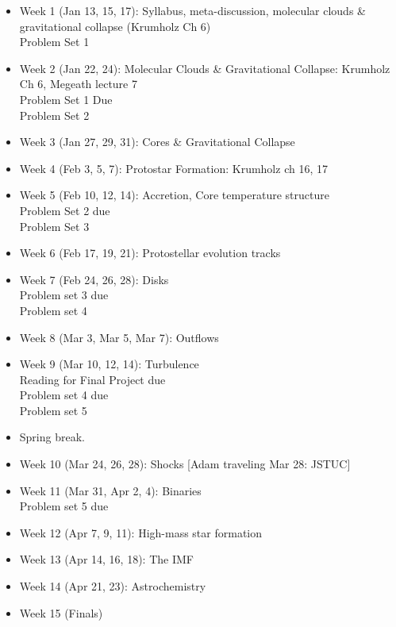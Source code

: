 \documentclass[11pt]{article}
\begin{document}
\begin{itemize}
    \item Week 1 (Jan 13, 15, 17): Syllabus, meta-discussion, molecular clouds \& gravitational collapse (Krumholz Ch 6) \\
        Problem Set 1
    \item Week 2 (Jan 22, 24): Molecular Clouds \& Gravitational Collapse: Krumholz Ch 6, Megeath lecture 7  \\
        Problem Set 1 Due \\
        Problem Set 2
    \item Week 3 (Jan 27, 29, 31): Cores \& Gravitational Collapse  \\
    \item Week 4 (Feb 3, 5, 7): Protostar Formation: Krumholz ch 16, 17  \\
    \item Week 5 (Feb 10, 12, 14): Accretion, Core temperature structure \\
        Problem Set 2 due\\
        Problem Set 3
    \item Week 6 (Feb 17, 19, 21): Protostellar evolution tracks \\
    \item Week 7 (Feb 24, 26, 28): Disks \\
        Problem set 3 due \\
        Problem set 4 
    \item Week 8 (Mar 3, Mar 5, Mar 7): Outflows  \\
    \item Week 9 (Mar 10, 12, 14): Turbulence \\
        Reading for Final Project due \\
        Problem set 4 due \\
        Problem set 5
    \item Spring break.
    \item Week 10 (Mar 24, 26, 28): Shocks [Adam traveling Mar 28: JSTUC] \\ 
    \item Week 11 (Mar 31, Apr 2, 4):  Binaries \\ 
        Problem set 5 due\\
    \item Week 12 (Apr 7, 9, 11):  High-mass star formation  \\
    \item Week 13 (Apr 14, 16, 18): The IMF \\
    \item Week 14 (Apr 21, 23):  Astrochemistry \\
    \item Week 15 (Finals)
\end{itemize}
\end{document}
